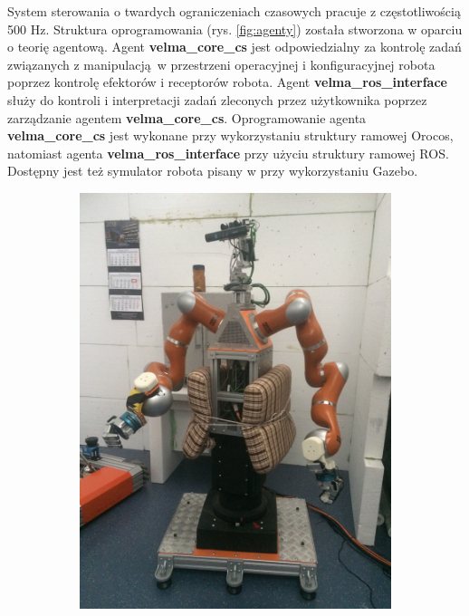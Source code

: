 \documentclass[12pt,a4paper]{article}
\begin{document}
	System sterowania o twardych ograniczeniach czasowych pracuje z częstotliwością 500 Hz. Struktura oprogramowania (rys. \ref{fig:agenty}) została stworzona w oparciu o teorię agentową. Agent \textbf{velma\_core\_cs} jest odpowiedzialny za kontrolę zadań związanych z manipulacją w przestrzeni operacyjnej i konfiguracyjnej robota poprzez kontrolę efektorów i receptorów robota. Agent \textbf{velma\_ros\_interface} służy do kontroli i interpretacji zadań zleconych przez użytkownika poprzez zarządzanie agentem \textbf{velma\_core\_cs}. Oprogramowanie agenta \textbf{velma\_core\_cs} jest wykonane przy wykorzystaniu struktury ramowej Orocos, natomiast agenta \textbf{velma\_ros\_interface} przy użyciu struktury ramowej ROS. Dostępny jest też symulator robota pisany w przy wykorzystaniu Gazebo.


	\begin{figure}
    \begin{subfigure}[b]{0.3\textwidth}
    	\centering
        \includegraphics[width=\textwidth, angle =-90]{velma}

\end{subfigure}
\end{figure}
\end{document}
